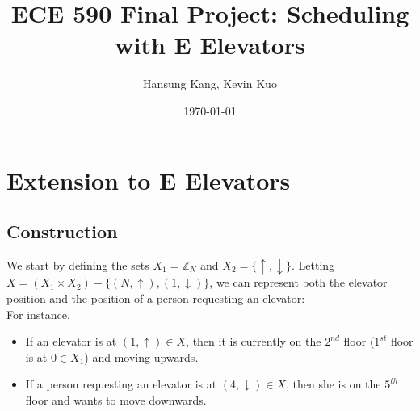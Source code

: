 \documentclass[letterpaper]{article} %
\begin{document}
\title{ECE 590 Final Project: Scheduling with E Elevators}
\author{Hansung Kang, Kevin Kuo}
\date{\today}
\maketitle

\section{Extension to E Elevators}
\subsection{Construction}
We start by defining the sets $X_1 = \mathbb{Z}_N$ and $X_2 = \{\uparrow, \downarrow\}$. Letting $X = (X_1 \times X_2) - \{(N, \uparrow), (1, \downarrow)\}$, we can represent both the elevator position and the position of a person requesting an elevator:\\

For instance, 
\begin{itemize}
	\item If an elevator is at $(1, \uparrow) \in X$, then it is currently on the $2^{nd}$ floor ($1^{st}$ floor is at $0 \in X_1$) and moving upwards.
	\item If a person requesting an elevator is at $(4, \downarrow) \in X$, then she is on the $5^{th}$ floor and wants to move downwards. 
\end{itemize}
\end{document}
